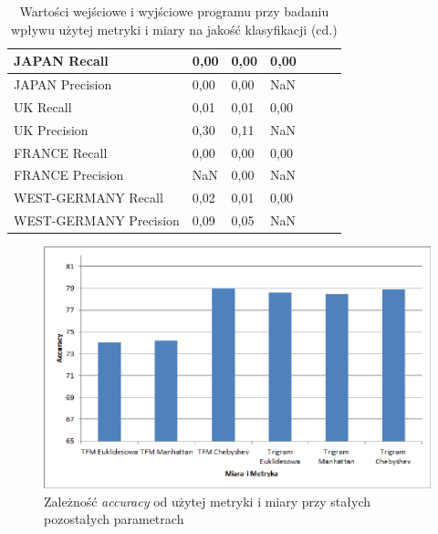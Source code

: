 \documentclass{classrep}
\begin{document}
{{\begin{table}[!htbp]
\begin{tabular}{|l|l|l|l|l|l|l|}
                        JAPAN Recall           & 0,00		        & 0,00		 & 0,00		        \\ \hline
                        JAPAN Precision        & 0,00		        & 0,00		 & NaN			     \\ \hline
                        UK Recall              & 0,01		        & 0,01		 & 0,00		        \\ \hline
                        UK Precision           & 0,30		        & 0,11		 & NaN			     \\ \hline
                        FRANCE Recall          & 0,00		        & 0,00		 & 0,00		        \\ \hline
                        FRANCE Precision       & NaN			    & 0,00		 & NaN			     \\ \hline
                        WEST-GERMANY Recall    & 0,02		        & 0,01		 & 0,00		        \\ \hline
                        WEST-GERMANY Precision & 0,09		        & 0,05		 & NaN			     \\ \hline
                    \end{tabular}
                \caption{Wartości wejściowe i wyjściowe programu przy badaniu wpływu użytej metryki i miary na jakość klasyfikacji (cd.)}
            \end{table}
            \FloatBarrier

            \begin{figure}[!htbp]
                \centering
                \includegraphics[width=\textwidth]{img/chart/accuracy_metric.png}
                \caption{Zależność \emph{accuracy} od użytej metryki i miary przy stałych pozostałych parametrach} \label{table-metric}
            \end{figure}
            \FloatBarrier
        }

}
\end{document}
